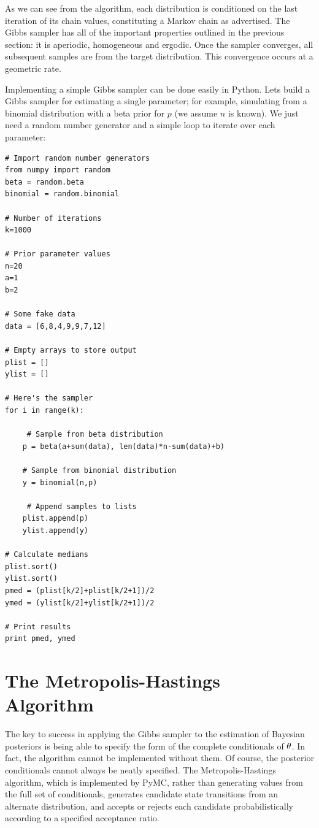 \documentclass[]{book}
\begin{document}
As we can see from the algorithm, each distribution is conditioned on the last iteration of its chain values, constituting a Markov chain as advertised. The Gibbs sampler has all of the important properties outlined in the previous section: it is aperiodic, homogeneous and ergodic. Once the sampler converges, all subsequent samples are from the target distribution. This convergence occurs at a geometric rate.

Implementing a simple Gibbs sampler can be done easily in Python. Lets build a Gibbs sampler for estimating a single parameter; for example, simulating from a binomial distribution with a beta prior for $p$ (we assume $n$ is known). We just need a random number generator and a simple loop to iterate over each parameter:
\vspace{1cm}
\begin{verbatim}
# Import random number generators
from numpy import random
beta = random.beta
binomial = random.binomial

# Number of iterations
k=1000

# Prior parameter values
n=20
a=1
b=2

# Some fake data
data = [6,8,4,9,9,7,12]

# Empty arrays to store output
plist = []
ylist = []

# Here's the sampler
for i in range(k):

     # Sample from beta distribution
    p = beta(a+sum(data), len(data)*n-sum(data)+b)

    # Sample from binomial distribution
    y = binomial(n,p)

     # Append samples to lists
    plist.append(p)
    ylist.append(y)

# Calculate medians
plist.sort()
ylist.sort()
pmed = (plist[k/2]+plist[k/2+1])/2
ymed = (ylist[k/2]+ylist[k/2+1])/2

# Print results
print pmed, ymed
\end{verbatim}
\vspace{1cm}

\section{The Metropolis-Hastings Algorithm}

The key to success in applying the Gibbs sampler to the estimation of Bayesian posteriors is being able to specify the form of the complete conditionals of ${\bf \theta}$. In fact, the algorithm cannot be implemented without them. Of course, the posterior conditionals cannot always be neatly specified. The Metropolis-Hastings algorithm, which is implemented by PyMC, rather than generating values from the full set of conditionals, generates candidate state transitions from an alternate distribution, and accepts or rejects each candidate probabilistically according to a specified acceptance ratio.
\end{document}

